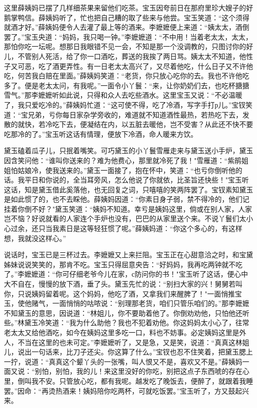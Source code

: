 这里薛姨妈已摆了几样细茶果来留他们吃茶。宝玉因夸前日在那府里珍大嫂子的好鹅掌鸭信。薛姨妈听了，忙也把自己糟的取了些来与他尝。宝玉笑道：“这个须得就酒才好。”薛姨妈便令人去灌了最上等的酒来。李嬷嬷便上来道：“姨太太，酒倒罢了。”宝玉央道：“妈妈，我只喝一钟。”李嬷嬷道：“不中用！当着老太太，太太，那怕你吃一坛呢。想那日我眼错不见一会，不知是那一个没调教的，只图讨你的好儿，不管别人死活，给了你一口酒吃，葬送的我挨了两日骂。姨太太不知道，他性子又可恶，吃了酒更弄性。有一日老太太高兴了，又尽着他吃，什么日子又不许他吃，何苦我白赔在里面。”薛姨妈笑道：“老货，你只放心吃你的去。我也不许他吃多了。便是老太太问，有我呢。”一面令小丫鬟：“来，让你奶奶们去，也吃杯搪搪雪气。”那李嬷嬷听如此说，只得和众人去吃些酒水。这里宝玉又说：“不必温暖了，我只爱吃冷的。”薛姨妈忙道：“这可使不得，吃了冷酒，写字手打р儿。”宝钗笑道：“宝兄弟，亏你每日家杂学旁收的，难道就不知道酒性最热，若热吃下去，发散的就快，若冷吃下去，便凝结在内，以五脏去暖他，岂不受害？从此还不快不要吃那冷的了。”宝玉听这话有情理，便放下冷酒，命人暖来方饮。

黛玉磕着瓜子儿，只抿着嘴笑。可巧黛玉的小丫鬟雪雁走来与黛玉送小手炉，黛玉因含笑问他：“谁叫你送来的？难为他费心，那里就冷死了我！"雪雁道：“紫鹃姐姐怕姑娘冷，使我送来的。”黛玉一面接了，抱在怀中，笑道：“也亏你倒听他的话。我平日和你说的，全当耳旁风，怎么他说了你就依，比圣旨还快些！"宝玉听这话，知是黛玉借此奚落他，也无回复之词，只嘻嘻的笑两阵罢了。宝钗素知黛玉是如此惯了的，也不去睬他。薛姨妈因道：“你素日身子弱，禁不得冷的，他们记挂着你倒不好？"黛玉笑道：“姨妈不知道。幸亏是姨妈这里，倘或在别人家，人家岂不恼？好说就看的人家连个手炉也没有，巴巴的从家里送个来。不说丫鬟们太小心过余，还只当我素日是这等轻狂惯了呢。”薛姨妈道：“你这个多心的，有这样想，我就没这样心。”

说话时，宝玉已是三杯过去。李嬷嬷又上来拦阻。宝玉正在心甜意洽之时，和宝黛姊妹说说笑笑的，那肯不吃。宝玉只得屈意央告：“好妈妈，我再吃两钟就不吃了。”李嬷嬷道：“你可仔细老爷今儿在家，с防问你的书！"宝玉听了这话，便心中大不自在，慢慢的放下酒，垂了头。黛玉先忙的说：“别扫大家的兴！舅舅若叫你，只说姨妈留着呢。这个妈妈，他吃了酒，又拿我们来醒脾了！"一面悄推宝玉，使他赌气，一面悄悄的咕哝说：“别理那老货，咱们只管乐咱们的。”那李嬷嬷不知黛玉的意思，因说道：“林姐儿，你不要助着他了。你倒劝劝他，只怕他还听些。”林黛玉冷笑道：“我为什么助他？我也不犯着劝他。你这妈妈太小心了，往常老太太又给他酒吃，如今在姨妈这里多吃一口，料也不妨事。必定姨妈这里是外人，不当在这里的也未可定。”李嬷嬷听了，又是急，又是笑，说道：“真真这林姐儿，说出一句话来，比刀子还尖。你这算了什么。”宝钗也忍不住笑着，把黛玉腮上一拧，说道：“真真这个颦丫头的一张嘴，叫人恨又不是，喜欢又不是。”薛姨妈一面又说：“别怕，别怕，我的儿！来这里没好的你吃，别把这点子东西唬的存在心里，倒叫我不安。只管放心吃，都有我呢。越发吃了晚饭去，便醉了，就跟着我睡罢。”因命：“再烫热酒来！姨妈陪你吃两杯，可就吃饭罢。”宝玉听了，方又鼓起兴来。

